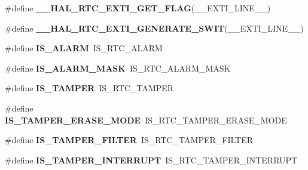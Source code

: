 \begin{DoxyCompactItemize}
\#define {\bfseries \+\_\+\+\_\+\+H\+A\+L\+\_\+\+R\+T\+C\+\_\+\+E\+X\+T\+I\+\_\+\+G\+E\+T\+\_\+\+F\+L\+AG}(\+\_\+\+\_\+\+E\+X\+T\+I\+\_\+\+L\+I\+N\+E\+\_\+\+\_\+)
\item 
\#define {\bfseries \+\_\+\+\_\+\+H\+A\+L\+\_\+\+R\+T\+C\+\_\+\+E\+X\+T\+I\+\_\+\+G\+E\+N\+E\+R\+A\+T\+E\+\_\+\+S\+W\+IT}(\+\_\+\+\_\+\+E\+X\+T\+I\+\_\+\+L\+I\+N\+E\+\_\+\+\_\+)
\item 
\mbox{\label{group___h_a_l___r_t_c___aliased___macros_ga7e6a2b69bd0cb85a1d44801ccb116e38}} 
\#define {\bfseries I\+S\+\_\+\+A\+L\+A\+RM}~I\+S\+\_\+\+R\+T\+C\+\_\+\+A\+L\+A\+RM
\item 
\mbox{\label{group___h_a_l___r_t_c___aliased___macros_ga927c5de67a80c6ea175db864959df3e0}} 
\#define {\bfseries I\+S\+\_\+\+A\+L\+A\+R\+M\+\_\+\+M\+A\+SK}~I\+S\+\_\+\+R\+T\+C\+\_\+\+A\+L\+A\+R\+M\+\_\+\+M\+A\+SK
\item 
\mbox{\label{group___h_a_l___r_t_c___aliased___macros_ga720879737ff77db80e800545672cdb72}} 
\#define {\bfseries I\+S\+\_\+\+T\+A\+M\+P\+ER}~I\+S\+\_\+\+R\+T\+C\+\_\+\+T\+A\+M\+P\+ER
\item 
\mbox{\label{group___h_a_l___r_t_c___aliased___macros_ga49cab06ba96add6f8dddac75414b468f}} 
\#define {\bfseries I\+S\+\_\+\+T\+A\+M\+P\+E\+R\+\_\+\+E\+R\+A\+S\+E\+\_\+\+M\+O\+DE}~I\+S\+\_\+\+R\+T\+C\+\_\+\+T\+A\+M\+P\+E\+R\+\_\+\+E\+R\+A\+S\+E\+\_\+\+M\+O\+DE
\item 
\mbox{\label{group___h_a_l___r_t_c___aliased___macros_ga96d532a9a8a0b283f2fd289355001233}} 
\#define {\bfseries I\+S\+\_\+\+T\+A\+M\+P\+E\+R\+\_\+\+F\+I\+L\+T\+ER}~I\+S\+\_\+\+R\+T\+C\+\_\+\+T\+A\+M\+P\+E\+R\+\_\+\+F\+I\+L\+T\+ER
\item 
\mbox{\label{group___h_a_l___r_t_c___aliased___macros_gaa441c6cceeee673784fd5f9dcd1a0334}} 
\#define {\bfseries I\+S\+\_\+\+T\+A\+M\+P\+E\+R\+\_\+\+I\+N\+T\+E\+R\+R\+U\+PT}~I\+S\+\_\+\+R\+T\+C\+\_\+\+T\+A\+M\+P\+E\+R\+\_\+\+I\+N\+T\+E\+R\+R\+U\+PT
\item 
\mbox{\label{group___h_a_l___r_t_c___aliased___macros_ga936b760d07038d51cd9a72f1f0456711}} 

\end{DoxyCompactItemize}
